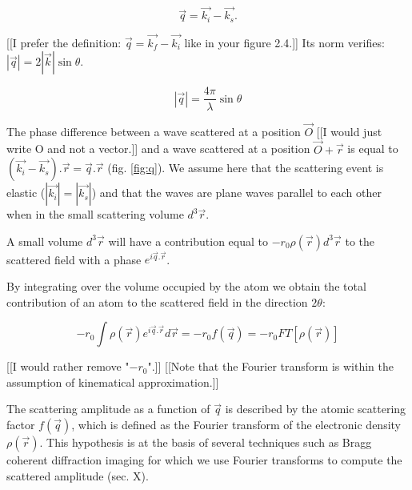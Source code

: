 \begin{equation}
    \label{eq:Q}
    \vec{q}=\vec{k_i}-\vec{k_s}.
\end{equation}

{\color{DarkOrange}[[I prefer the definition: $\vec{q}=\vec{k_f}-\vec{k_i}$ like in your figure 2.4.]]}
{\color{DarkOrange}Its norm verifies: $|\vec{q}|=2|\vec{k}|\sin{\theta}$.}

\begin{equation}
    \label{eq:QSinTheta}
    |\vec{q}| = \frac{4\pi}{\lambda} \sin{\theta}
\end{equation}

The phase difference between a wave scattered at a position $\vec{O}$ {\color{DarkOrange}[[I would just write O and not a vector.]]} and a wave scattered at a position $\vec{O}+\vec{r}$ is equal to $(\vec{k_i} - \vec{k_s}).\vec{r} = \vec{q}.\vec{r}$ (fig. \ref{fig:q}).
We assume here that the scattering event is elastic ($|\vec{k_i}|=|\vec{k_s}|$) and that the waves are plane waves parallel to each other when in the small scattering volume $d^3\vec{r}$.

A small volume $d^3\vec{r}$ will have a contribution equal to $-r_0 \rho(\vec{r})d^3\vec{r}$ to the scattered field with a phase $e^{i\vec{q}.\vec{r}}$.

By integrating over the volume occupied by the atom we obtain the total contribution of an atom to the scattered field in the direction $2\theta$:

\begin{equation}
    \label{eq:AtomicFormFactor}
    -r_0 \int \rho (\vec{r}) e^{i\vec{q}.\vec{r}} d\vec{r} = -r_0 f(\vec{q}) = -r_0 FT [\rho (\vec{r})]
\end{equation}

{\color{DarkOrange}[[I would rather remove "$-r_0$".]]}
{\color{DarkOrange}[[Note that the Fourier transform is within the assumption of kinematical approximation.]]}

The scattering amplitude as a function of $\vec{q}$ is described by the atomic scattering factor $f(\vec{q})$, which is defined as the Fourier transform of the electronic density $\rho(\vec{r})$.
This hypothesis is at the basis of several techniques such as Bragg coherent diffraction imaging for which we use Fourier transforms to compute the scattered amplitude (sec. X).

